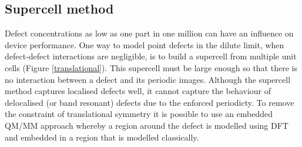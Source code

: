 



\subsection{Supercell method}

Defect concentrations as low as one part in one million can have an influence on device performance. 
One way to model point defects in the dilute limit, when defect-defect interactions are negligible, is to build a supercell from multiple unit cells (Figure \ref{translational}).
This supercell must be large enough so that there is no interaction between a defect and its periodic images.
Although the supercell method captures localised defects well, it cannot capture the behaviour of delocalised (or band resonant) defects due to the enforced periodicty. 
To remove the constraint of translational symmetry it is possible to use an embedded QM/MM approach whereby a region around the defect is modelled using DFT and embedded in a region that is modelled classically.

